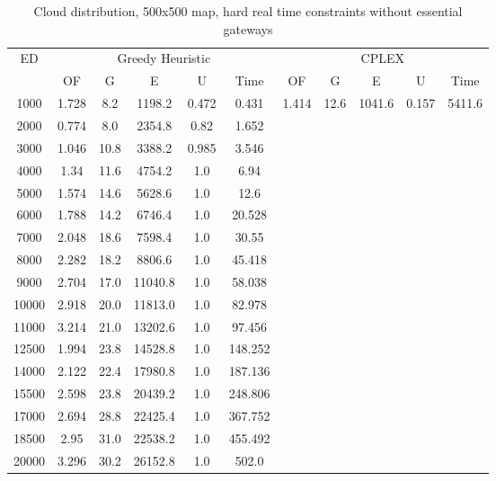 \begin{table}[htb]
	\centering
	\begin{tabular}{|c|c|c|c|c|c|c|c|c|c|c|}
		\hline
		\multirow{2}{*}{ED} & \multicolumn{5}{c|}{Greedy Heuristic} & \multicolumn{5}{c|}{CPLEX}\\ 
		\cline{2-11}
& OF & G & E & U & Time & OF & G & E & U & Time\\ 
		\hline
		1000 & 1.728 & 8.2 & 1198.2 & 0.472 & 0.431 & 1.414 & 12.6 & 1041.6 & 0.157 & 5411.6 \\ 
		2000 & 0.774 & 8.0 & 2354.8 & 0.82 & 1.652 & & & & &  \\ 
		3000 & 1.046 & 10.8 & 3388.2 & 0.985 & 3.546 & & & & &  \\ 
		4000 & 1.34 & 11.6 & 4754.2 & 1.0 & 6.94 & & & & &  \\ 
		5000 & 1.574 & 14.6 & 5628.6 & 1.0 & 12.6 & & & & &  \\ 
		6000 & 1.788 & 14.2 & 6746.4 & 1.0 & 20.528 & & & & &  \\ 
		7000 & 2.048 & 18.6 & 7598.4 & 1.0 & 30.55 & & & & &  \\ 
		8000 & 2.282 & 18.2 & 8806.6 & 1.0 & 45.418 & & & & &  \\ 
		9000 & 2.704 & 17.0 & 11040.8 & 1.0 & 58.038 & & & & &  \\ 
		10000 & 2.918 & 20.0 & 11813.0 & 1.0 & 82.978 & & & & &  \\ 
		11000 & 3.214 & 21.0 & 13202.6 & 1.0 & 97.456 & & & & &  \\ 
		12500 & 1.994 & 23.8 & 14528.8 & 1.0 & 148.252 & & & & &  \\ 
		14000 & 2.122 & 22.4 & 17980.8 & 1.0 & 187.136 & & & & &  \\ 
		15500 & 2.598 & 23.8 & 20439.2 & 1.0 & 248.806 & & & & &  \\ 
		17000 & 2.694 & 28.8 & 22425.4 & 1.0 & 367.752 & & & & &  \\ 
		18500 & 2.95 & 31.0 & 22538.2 & 1.0 & 455.492 & & & & &  \\ 
		20000 & 3.296 & 30.2 & 26152.8 & 1.0 & 502.0 & & & & &  \\ 
		\hline 
	\end{tabular} 
	\caption{Cloud distribution, 500x500 map, hard real time constraints without essential gateways} 
	\label{tab:cloud_hard_n_esc_500} 
\end{table} 


